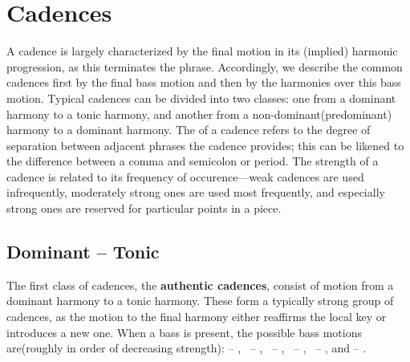 \section{Cadences}

A cadence is largely characterized by the final motion in its (implied) harmonic progression, as this terminates the phrase. Accordingly, we describe the common cadences first by the final bass motion and then by the harmonies over this bass motion. Typical cadences can be divided into two classes: one from a dominant harmony to a tonic harmony, and another from a non-dominant(predominant) harmony to a dominant harmony. The  of a cadence refers to the degree of separation between adjacent phrases the cadence provides; this can be likened to the difference between a comma and semicolon or period. The strength of a cadence is related to its frequency of occurence---weak cadences are used infrequently, moderately strong ones are used most frequently, and especially strong ones are reserved for particular points in a piece.

\subsection{Dominant -- Tonic}
The first class of cadences, the \textbf{authentic cadences}, consist of motion from a dominant harmony to a tonic harmony. These form a typically strong group of cadences, as the motion to the final harmony either reaffirms the local key or introduces a new one. When a bass is present, the possible bass motions are(roughly in order of decreasing strength):  -- , \,  -- , \,  -- , \,  -- , \,  -- , and  -- .


